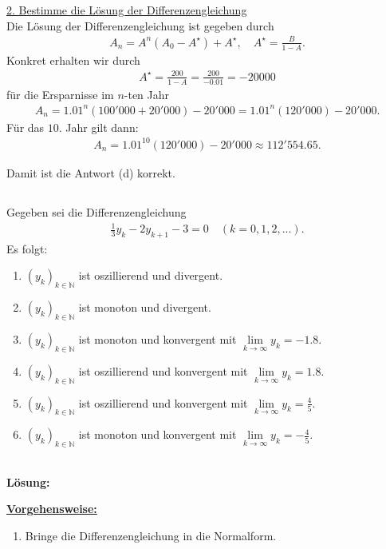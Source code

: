 \underline{2. Bestimme die Lösung der Differenzengleichung}\\
Die Lösung der Differenzengleichung ist gegeben durch
\begin{align*}
	A_n = A^n (A_0 - A^\star) + A^\star, \quad A^\star = \frac{B}{1-A}.
\end{align*}
Konkret erhalten wir durch
\begin{align*}
	A^\star = \frac{200}{1-A} = \frac{200}{-0.01} = -20000
\end{align*}
für die Ersparnisse im $n$-ten Jahr
\begin{align*}
	A_n = 1.01^n (100'000 + 20'000) - 20'000
	= 1.01^n (120'000 ) - 20'000.
\end{align*}
Für das $10$. Jahr gilt dann:
\begin{align*}
	A_n
	=
	1.01^10 (120'000 ) - 20'000
	\approx
	112'554.65.
\end{align*}

Damit ist die Antwort (d) korrekt.

\newpage

\subsection*{}
Gegeben sei die Differenzengleichung
\begin{align*}
	\frac{1}{3} y_k
	-
	2 y_{k+1}
	-3
	=0
	\quad (k = 0,1,2,...).
\end{align*}
Es folgt:
\renewcommand{\labelenumi}{(\alph{enumi})}
\begin{enumerate}
	\item
	$ (y_k)_{k \in \mathbb{N}} $ ist oszillierend und divergent.
	\item
	$ (y_k)_{k \in \mathbb{N}} $ ist monoton und divergent.	
	\item 
	$ (y_k)_{k \in \mathbb{N}} $ ist monoton und konvergent mit $ \lim \limits_{k \to \infty} y_k = -1.8$.
	\item
	$ (y_k)_{k \in \mathbb{N}} $ ist oszillierend und konvergent mit $ \lim \limits_{k \to \infty} y_k = 1.8$.
	\item 
	$ (y_k)_{k \in \mathbb{N}} $ ist oszillierend und konvergent mit $ \lim \limits_{k \to \infty} y_k = \frac{4}{5}$.
	\item 
	$ (y_k)_{k \in \mathbb{N}} $ ist monoton und konvergent mit $ \lim \limits_{k \to \infty} y_k = -\frac{4}{5}$.
\end{enumerate}
\ \\
\textbf{Lösung:}
\begin{mdframed}
\underline{\textbf{Vorgehensweise:}}
\renewcommand{\labelenumi}{\theenumi.}
\begin{enumerate}
\item Bringe die Differenzengleichung in die Normalform.
\end{enumerate}
\end{mdframed}

